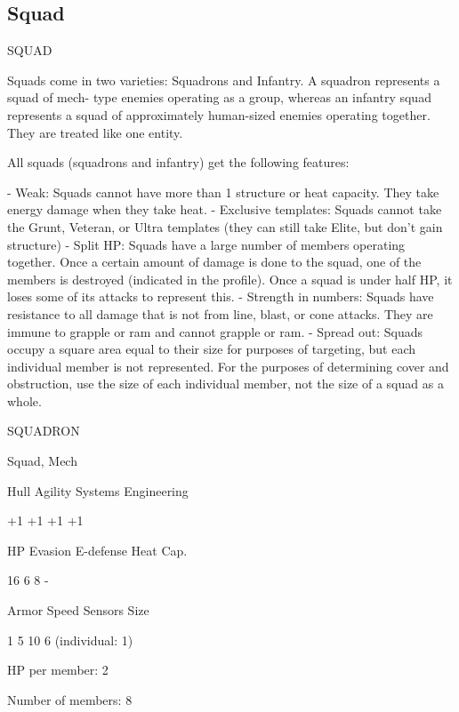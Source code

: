 \subsection{Squad}

                                                 SQUAD

Squads come in two varieties: Squadrons and Infantry. A squadron represents a squad of mech-
type enemies operating as a group, whereas an infantry squad represents a squad of
approximately human-sized enemies operating together. They are treated like one entity.


All squads (squadrons and infantry) get the following features:

    -   Weak: Squads cannot have more than 1 structure or heat capacity. They take energy
        damage when they take heat.
    -   Exclusive templates: Squads cannot take the Grunt, Veteran, or Ultra templates (they
        can still take Elite, but don’t gain structure)
    -   Split HP: Squads have a large number of members operating together. Once a certain
        amount of damage is done to the squad, one of the members is destroyed (indicated in
        the profile). Once a squad is under half HP, it loses some of its attacks to represent this.
    -   Strength in numbers: Squads have resistance to all damage that is not from line, blast,
        or cone attacks. They are immune to grapple or ram and cannot grapple or ram.
    -   Spread out: Squads occupy a square area equal to their size for purposes of targeting,
        but each individual member is not represented. For the purposes of determining cover
        and obstruction, use the size of each individual member, not the size of a squad as a
        whole.

       SQUADRON

       Squad, Mech

       Hull       Agility     Systems       Engineering

       +1         +1          +1            +1

       HP         Evasion     E-defense     Heat Cap.

       16         6           8             -

       Armor      Speed       Sensors       Size

       1          5           10            6 (individual:
                                            1)

HP per member: 2

Number of members: 8


